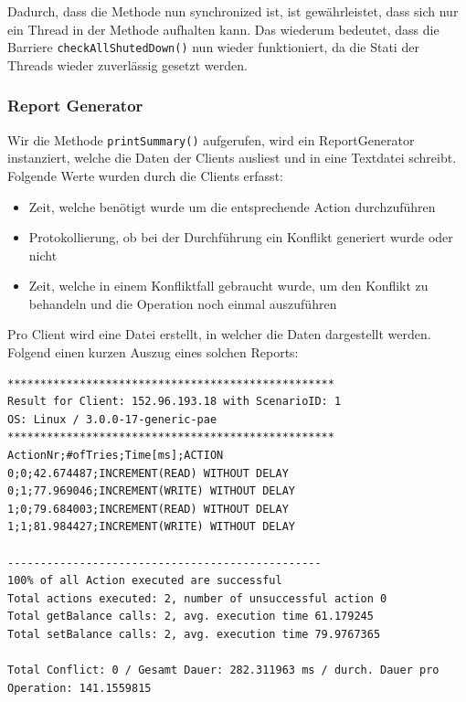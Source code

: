 Dadurch, dass die Methode nun synchronized ist, ist gewährleistet, dass sich nur ein Thread in der Methode aufhalten kann. Das wiederum bedeutet, dass die Barriere \texttt{checkAllShutedDown()} nun wieder funktioniert, da die Stati der Threads wieder zuverlässig gesetzt werden.

\subsubsection{Report Generator}
\label{sec:reportGenerator}

Wir die Methode \texttt{printSummary()} aufgerufen, wird ein ReportGenerator instanziert, welche die Daten der Clients ausliest und in eine Textdatei schreibt. Folgende Werte wurden durch die Clients erfasst:
\begin{itemize}
\item Zeit, welche benötigt wurde um die entsprechende Action durch\-zu\-führen
\item Protokollierung, ob bei der Durchführung ein Konflikt generiert wurde oder nicht
\item Zeit, welche in einem Konfliktfall gebraucht wurde, um den Konflikt zu behandeln und die Operation noch einmal auszuführen
\end{itemize}

Pro Client wird eine Datei erstellt, in welcher die Daten dargestellt werden. Folgend einen kurzen Auszug eines solchen Reports:

\begin{lstlisting}[breaklines=true]
**************************************************
Result for Client: 152.96.193.18 with ScenarioID: 1
OS: Linux / 3.0.0-17-generic-pae
**************************************************
ActionNr;#ofTries;Time[ms];ACTION
0;0;42.674487;INCREMENT(READ) WITHOUT DELAY
0;1;77.969046;INCREMENT(WRITE) WITHOUT DELAY
1;0;79.684003;INCREMENT(READ) WITHOUT DELAY
1;1;81.984427;INCREMENT(WRITE) WITHOUT DELAY

------------------------------------------------
100% of all Action executed are successful
Total actions executed: 2, number of unsuccessful action 0
Total getBalance calls: 2, avg. execution time 61.179245
Total setBalance calls: 2, avg. execution time 79.9767365

Total Conflict: 0 / Gesamt Dauer: 282.311963 ms / durch. Dauer pro Operation: 141.1559815
\end{lstlisting}

